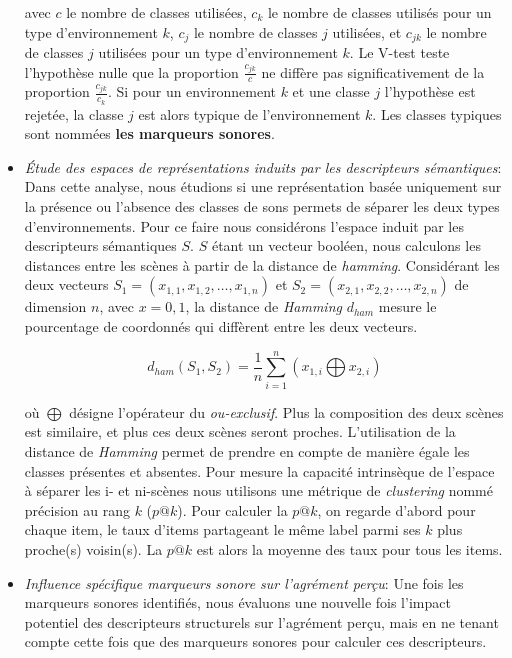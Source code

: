 \begin{itemize}
avec $c$ le nombre de classes utilisées, $c_k$ le nombre de classes utilisés pour un type d'environnement $k$, $c_j$ le nombre de classes $j$ utilisées, et $c_{jk}$ le nombre de classes $j$ utilisées pour un type d'environnement $k$. Le V-test teste l'hypothèse nulle que la proportion $\frac{c_{jk}}{c}$ ne diffère pas significativement de la proportion $\frac{c_{jk}}{c_k}$. Si pour un environnement $k$ et une classe $j$ l'hypothèse est rejetée, la classe $j$ est alors typique de l'environnement $k$. Les classes typiques sont nommées \textbf{les marqueurs sonores}.

\item \emph{Étude des espaces de représentations induits par les descripteurs sémantiques}: Dans cette analyse, nous étudions si une représentation basée uniquement sur la présence ou l'absence des classes de sons permets de séparer les deux types d'environnements. Pour ce faire nous considérons l'espace induit par les descripteurs sémantiques $S$. $S$ étant un vecteur booléen, nous calculons les distances entre les scènes à partir de la distance de \emph{hamming}. Considérant les deux vecteurs $S_1=(x_{1,1},x_{1,2},\ldots,x_{1,n})$ et $S_2=(x_{2,1},x_{2,2},\ldots,x_{2,n})$ de dimension $n$, avec $x={0,1}$, la distance de \emph{Hamming} $d_{ham}$ mesure le pourcentage de coordonnés qui diffèrent entre les deux vecteurs. 


\begin{equation*}
d_{ham}(S_1,S_2)=\dfrac{1}{n}\sum_{i=1}^{n} (x_{1,i} \bigoplus x_{2,i})
\end{equation*}

où $\bigoplus$ désigne l'opérateur du \emph{ou-exclusif}. Plus la composition des deux scènes est similaire, et plus ces deux scènes seront proches. L'utilisation de la distance de \emph{Hamming} permet de prendre en compte de manière égale les classes présentes et absentes. Pour mesure la capacité intrinsèque de l'espace à séparer les i- et ni-scènes nous utilisons une métrique de \emph{clustering} nommé précision au rang $k$ ($p@k$). Pour calculer la $p@k$, on regarde d'abord pour chaque item, le taux d'items partageant le même label parmi ses $k$ plus proche(s) voisin(s). La $p@k$ est alors la moyenne des taux pour tous les items.

\item \emph{Influence spécifique marqueurs sonore sur l'agrément perçu}: Une fois les marqueurs sonores identifiés, nous évaluons une nouvelle fois l'impact potentiel des descripteurs structurels sur l'agrément perçu, mais en ne tenant compte cette fois que des marqueurs sonores pour calculer ces descripteurs.
\end{itemize}

